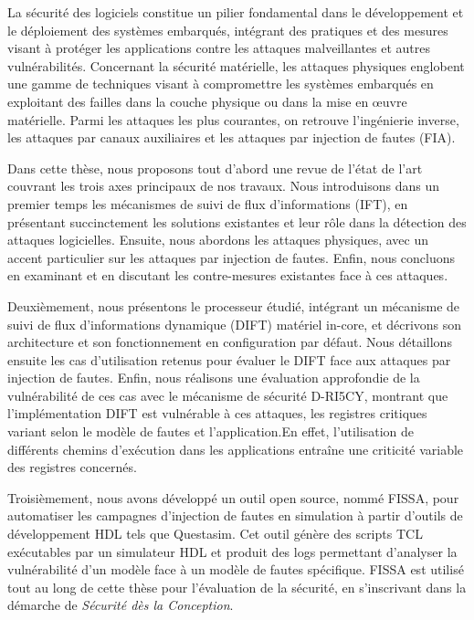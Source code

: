 La sécurité des logiciels constitue un pilier fondamental dans le développement et le déploiement des systèmes embarqués, intégrant des pratiques et des mesures visant à protéger les applications contre les attaques malveillantes et autres vulnérabilités. Concernant la sécurité matérielle, les attaques physiques englobent une gamme de techniques visant à compromettre les systèmes embarqués en exploitant des failles dans la couche physique ou dans la mise en œuvre matérielle. Parmi les attaques les plus courantes, on retrouve l’ingénierie inverse, les attaques par canaux auxiliaires et les attaques par injection de fautes (FIA).

Dans cette thèse, nous proposons tout d’abord une revue de l’état de l’art couvrant les trois axes principaux de nos travaux. Nous introduisons dans un premier temps les mécanismes de suivi de flux d’informations (IFT), en présentant succinctement les solutions existantes et leur rôle dans la détection des attaques logicielles. Ensuite, nous abordons les attaques physiques, avec un accent particulier sur les attaques par injection de fautes. Enfin, nous concluons en examinant et en discutant les contre-mesures existantes face à ces attaques.

Deuxièmement, nous présentons le processeur étudié, intégrant un mécanisme de suivi de flux d’informations dynamique (DIFT) matériel in-core, et décrivons son architecture et son fonctionnement en configuration par défaut. Nous détaillons ensuite les cas d'utilisation retenus pour évaluer le DIFT face aux attaques par injection de fautes. Enfin, nous réalisons une évaluation approfondie de la vulnérabilité de ces cas avec le mécanisme de sécurité D-RI5CY, montrant que l'implémentation DIFT est vulnérable à ces attaques, les registres critiques variant selon le modèle de fautes et l'application.En effet, l’utilisation de différents chemins d’exécution dans les applications entraîne une criticité variable des registres concernés.

Troisièmement, nous avons développé un outil open source, nommé FISSA, pour automatiser les campagnes d’injection de fautes en simulation à partir d'outils de développement HDL tels que Questasim. Cet outil génère des scripts TCL exécutables par un simulateur HDL et produit des logs permettant d’analyser la vulnérabilité d’un modèle face à un modèle de fautes spécifique. FISSA est utilisé tout au long de cette thèse pour l’évaluation de la sécurité, en s’inscrivant dans la démarche de \textit{Sécurité dès la Conception}.

